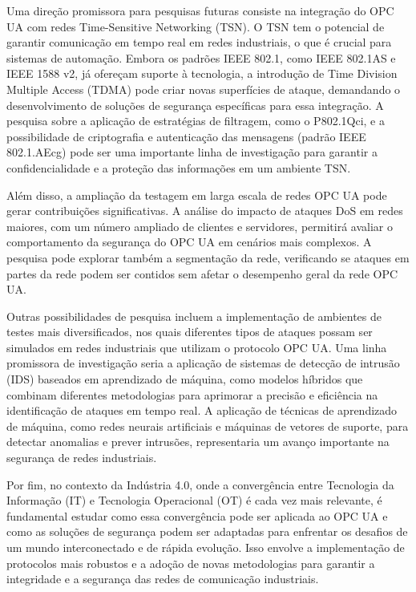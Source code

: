     Uma direção promissora para pesquisas futuras consiste na integração do OPC UA com redes Time-Sensitive Networking (TSN). O TSN tem o potencial de garantir comunicação em tempo real em redes industriais, o que é crucial para sistemas de automação. Embora os padrões IEEE 802.1, como IEEE 802.1AS e IEEE 1588 v2, já ofereçam suporte à tecnologia, a introdução de Time Division Multiple Access (TDMA) pode criar novas superfícies de ataque, demandando o desenvolvimento de soluções de segurança específicas para essa integração. A pesquisa sobre a aplicação de estratégias de filtragem, como o P802.1Qci, e a possibilidade de criptografia e autenticação das mensagens (padrão IEEE 802.1.AEcg) pode ser uma importante linha de investigação para garantir a confidencialidade e a proteção das informações em um ambiente TSN.

    Além disso, a ampliação da testagem em larga escala de redes OPC UA pode gerar contribuições significativas. A análise do impacto de ataques DoS em redes maiores, com um número ampliado de clientes e servidores, permitirá avaliar o comportamento da segurança do OPC UA em cenários mais complexos. A pesquisa pode explorar também a segmentação da rede, verificando se ataques em partes da rede podem ser contidos sem afetar o desempenho geral da rede OPC UA.

    Outras possibilidades de pesquisa incluem a implementação de ambientes de testes mais diversificados, nos quais diferentes tipos de ataques possam ser simulados em redes industriais que utilizam o protocolo OPC UA. Uma linha promissora de investigação seria a aplicação de sistemas de detecção de intrusão (IDS) baseados em aprendizado de máquina, como modelos híbridos que combinam diferentes metodologias para aprimorar a precisão e eficiência na identificação de ataques em tempo real. A aplicação de técnicas de aprendizado de máquina, como redes neurais artificiais e máquinas de vetores de suporte, para detectar anomalias e prever intrusões, representaria um avanço importante na segurança de redes industriais.

    Por fim, no contexto da Indústria 4.0, onde a convergência entre Tecnologia da Informação (IT) e Tecnologia Operacional (OT) é cada vez mais relevante, é fundamental estudar como essa convergência pode ser aplicada ao OPC UA e como as soluções de segurança podem ser adaptadas para enfrentar os desafios de um mundo interconectado e de rápida evolução. Isso envolve a implementação de protocolos mais robustos e a adoção de novas metodologias para garantir a integridade e a segurança das redes de comunicação industriais.

